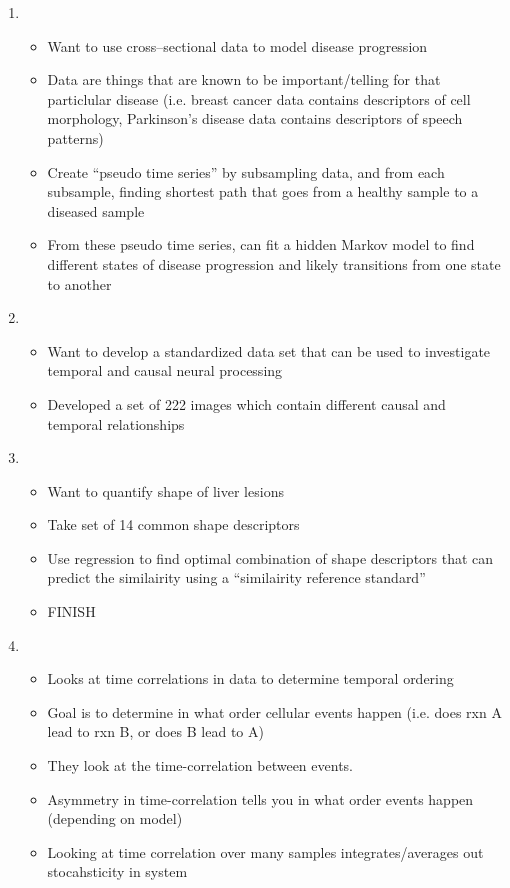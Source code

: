 \documentclass[12pt]{article}
\begin{document}
\begin{enumerate}
\item {}
\begin{itemize}
	\item Want to use cross--sectional data to model disease progression
	\item Data are things that are known to be important/telling for that particlular disease (i.e. breast cancer data contains descriptors of cell morphology, Parkinson's disease data contains descriptors of speech patterns)
	\item Create ``pseudo time series'' by subsampling data, and from each subsample, finding shortest path that goes from a healthy sample to a diseased sample
	\item From these pseudo time series, can fit a hidden Markov model to find different states of disease progression and likely transitions from one state to another
\end{itemize}

\item {}
\begin{itemize}
	\item Want to develop a standardized data set that can be used to investigate temporal and causal neural processing
	\item Developed a set of 222 images which contain different causal and temporal relationships
\end{itemize}

\item {}
\begin{itemize}
	\item Want to quantify shape of liver lesions
	\item Take set of 14 common shape descriptors
	\item Use regression to find optimal combination of shape descriptors that can predict the similairity using a ``similairity reference standard''
	\item FINISH
\end{itemize}
\item {}
\begin{itemize}
	\item Looks at time correlations in data to determine temporal ordering
	\item Goal is to determine in what order cellular events happen (i.e. does rxn A lead to rxn B, or does B lead to A)
	\item They look at the time-correlation between events.
	\item Asymmetry in time-correlation tells you in what order events happen (depending on model)
	\item Looking at time correlation over many samples integrates/averages out stocahsticity in system
\end{itemize}


\end{enumerate}
\end{document}
